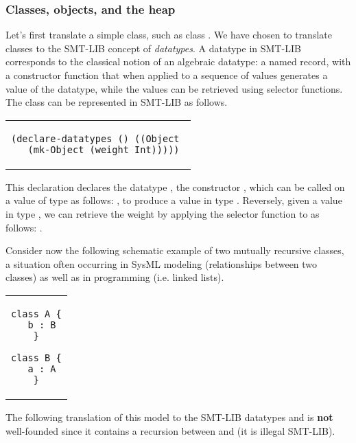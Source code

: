 \subsubsection{Classes, objects, and the heap}

Let's first translate a simple class, such as class .  We
have chosen to translate classes to the SMT-LIB concept of {\em
  datatypes}. A datatype in SMT-LIB corresponds to the classical
notion of an algebraic datatype: a named record, with a constructor
function that when applied to a sequence of values generates a value
of the datatype, while the values can be retrieved using
selector functions.  The class  can be represented in SMT-LIB as
follows.

\lstset{language=SMT,numbers=none}

\begin{center}
\begin{tabular}{c}
\begin{lstlisting}
(declare-datatypes () ((Object 
  (mk-Object (weight Int)))))
\end{lstlisting}
\end{tabular}
\end{center}

This declaration declares the datatype , the constructor
, which can be called on a value  of type
 as follows: , to produce a value in
type . Reversely, given a value  in type
, we can retrieve the weight by applying the selector
function  to  as follows: .

Consider now the following schematic example of two mutually recursive
classes, a situation often occurring in SysML modeling (relationships
between two classes) as well as in programming (i.e. linked lists).

\lstset{language=K}

\begin{center}
\begin{tabular}{c}
\begin{lstlisting}
class A {
  b : B
}

class B {
  a : A
}
\end{lstlisting}
\end{tabular}
\end{center}

The following translation of this model to the SMT-LIB datatypes
 and  is {\bf not} well-founded since it contains a
recursion between  and  (it is illegal SMT-LIB).

